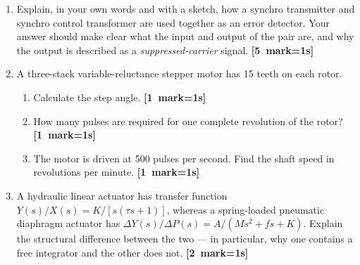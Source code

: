 \documentclass[11pt,a4paper]{article}
\newcommand{\qmarks}[1]{\hfill\mbox{\small\color{fnavy}\textbf{[#1 mark\ifnum#1=1\else s\fi]}}}
\begin{document}
\begin{enumerate}[label=(\alph*)]
\item Explain, in your own words and with a sketch, how a synchro
      transmitter and synchro control transformer are used together as an error
      detector. Your answer should make clear what the input and output of the
      pair are, and why the output is described as a
      \emph{suppressed-carrier} signal. \qmarks{5}

\item A three-stack variable-reluctance stepper motor has 15 teeth on each
      rotor.
      \begin{enumerate}[label=(\roman*)]
      \item Calculate the step angle. \qmarks{1}
      \item How many pulses are required for one complete revolution of the
            rotor? \qmarks{1}
      \item The motor is driven at 500 pulses per second. Find the shaft speed
            in revolutions per minute. \qmarks{1}
      \end{enumerate}

\item A hydraulic linear actuator has transfer function
      $Y(s)/X(s)=K/[s(\tau s+1)]$, whereas a spring-loaded pneumatic diaphragm
      actuator has $\Delta Y(s)/\Delta P(s)=A/(Ms^{2}+fs+K)$. Explain the
      structural difference between the two --- in particular, why one contains
      a free integrator and the other does not. \qmarks{2}
\end{enumerate}
\end{document}

